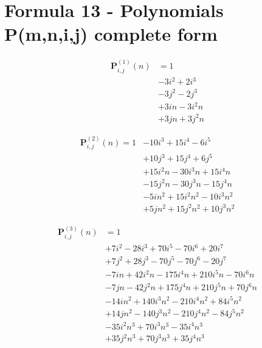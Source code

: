 \documentclass[12pt, letterpaper]{amsart}
\theoremstyle{definition}
\theoremstyle{remark}
\numberwithin{equation}{section}
\begin{document}
\section{Formula 13 - Polynomials P(m,n,i,j) complete form}
\begin{equation*}
\begin{split}
\mathbf{P}^{(1)}_{i,j}(n)
&=1 \\
&-3 i^2 + 2 i^3 \\
&-3 j^2 - 2 j^3 \\
&+3 i n - 3 i^2 n \\
&+3 j n + 3 j^2 n
\end{split}
\end{equation*}

\begin{equation*}
\begin{split}
\mathbf{P}^{(2)}_{i,j}(n) =
1 &- 10 i^3 + 15 i^4 - 6 i^5\\
  &+ 10 j^3 + 15 j^4 + 6 j^5 \\
  &+ 15 i^2 n - 30 i^3 n + 15 i^4 n\\
  &- 15 j^2 n - 30 j^3 n - 15 j^4 n \\
  &- 5 i n^2 + 15 i^2 n^2 - 10 i^3 n^2 \\
  &+ 5 j n^2 + 15 j^2 n^2 + 10 j^3 n^2
\end{split}
\end{equation*}

\begin{equation*}
\begin{split}
\mathbf{P}^{(3)}_{i,j}(n) &=1 \\
&+7 i^2 - 28 i^3 + 70 i^5 - 70 i^6 + 20 i^7 \\
&+7 j^2 + 28 j^3 -70 j^5 - 70 j^6 - 20 j^7 \\
&-7 i n + 42 i^2 n - 175 i^4 n + 210 i^5 n - 70 i^6 n \\
&-7 j n - 42 j^2 n + 175 j^4 n + 210 j^5 n +70 j^6 n \\
&-14 i n^2 + 140 i^3 n^2 - 210 i^4 n^2 + 84 i^5 n^2 \\
&+14 j n^2 - 140 j^3 n^2 - 210 j^4 n^2 - 84 j^5 n^2 \\
&-35 i^2 n^3 + 70 i^3 n^3 - 35 i^4 n^3 \\
&+35 j^2 n^3 + 70 j^3 n^3 + 35 j^4 n^3
\end{split}
\end{equation*}
\end{document}
